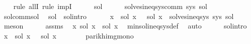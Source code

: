 \begin{isabellebody}
\ \ \isamarkupfalse%
\ {\isacharparenleft}{\kern0pt}rule\ allI{\isacharcomma}{\kern0pt}\ rule\ impI{\isacharparenright}{\kern0pt}\isanewline
\ \ \ \ \isamarkupfalse%
\ sol{\isacharprime}{\kern0pt}\isanewline
\ \ \ \ \isamarkupfalse%
\ {\isachardoublequoteopen}solves{\isacharunderscore}{\kern0pt}ineq{\isacharunderscore}{\kern0pt}sys{\isacharunderscore}{\kern0pt}comm\ sys\ sol{\isacharprime}{\kern0pt}{\isachardoublequoteclose}\isanewline
\ \ \ \ \isamarkupfalse%
\ sol{\isacharunderscore}{\kern0pt}comm{\isacharunderscore}{\kern0pt}sol\ \isamarkupfalse%
\ sol{\isacharprime}{\kern0pt}{\isacharprime}{\kern0pt}\ \ sol{\isacharprime}{\kern0pt}{\isacharprime}{\kern0pt}{\isacharunderscore}{\kern0pt}intro{\isacharcolon}{\kern0pt}\isanewline
\ \ \ \ \ \ {\isachardoublequoteopen}{\isacharparenleft}{\kern0pt}{\isasymforall}x{\isachardot}{\kern0pt}\ {\isasymPsi}\ {\isacharparenleft}{\kern0pt}sol{\isacharprime}{\kern0pt}\ x{\isacharparenright}{\kern0pt}\ {\isacharequal}{\kern0pt}\ {\isasymPsi}\ {\isacharparenleft}{\kern0pt}sol{\isacharprime}{\kern0pt}{\isacharprime}{\kern0pt}\ x{\isacharparenright}{\kern0pt}{\isacharparenright}{\kern0pt}\ {\isasymand}\ solves{\isacharunderscore}{\kern0pt}ineq{\isacharunderscore}{\kern0pt}sys\ sys\ sol{\isacharprime}{\kern0pt}{\isacharprime}{\kern0pt}{\isachardoublequoteclose}\ \isamarkupfalse%
\ meson\isanewline
\ \ \ \ \isamarkupfalse%
\ assms\ \isamarkupfalse%
\ {\isachardoublequoteopen}{\isasymforall}x{\isachardot}{\kern0pt}\ sol\ x\ {\isasymsubseteq}\ sol{\isacharprime}{\kern0pt}{\isacharprime}{\kern0pt}\ x{\isachardoublequoteclose}\ \isamarkupfalse%
\ min{\isacharunderscore}{\kern0pt}sol{\isacharunderscore}{\kern0pt}ineq{\isacharunderscore}{\kern0pt}sys{\isacharunderscore}{\kern0pt}def\ \isamarkupfalse%
\ auto\isanewline
\ \ \ \ \isamarkupfalse%
\ sol{\isacharprime}{\kern0pt}{\isacharprime}{\kern0pt}{\isacharunderscore}{\kern0pt}intro\ \isamarkupfalse%
\ {\isachardoublequoteopen}{\isasymforall}x{\isachardot}{\kern0pt}\ {\isasymPsi}\ {\isacharparenleft}{\kern0pt}sol\ x{\isacharparenright}{\kern0pt}\ {\isasymsubseteq}\ {\isasymPsi}\ {\isacharparenleft}{\kern0pt}sol{\isacharprime}{\kern0pt}\ x{\isacharparenright}{\kern0pt}{\isachardoublequoteclose}\isanewline
\ \ \ \ \ \ \isamarkupfalse%
\ parikh{\isacharunderscore}{\kern0pt}img{\isacharunderscore}{\kern0pt}mono\ \isamarkupfalse%

\end{isabellebody}

